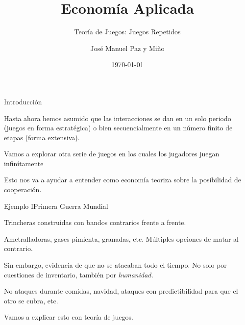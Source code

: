 \documentclass[notes, 11pt]{beamer} %
\newenvironment{wideitemize}{\itemize\addtolength{\itemsep}{10pt}}{\enditemize}
\begin{document}
\title{Econom\'ia Aplicada}   
\subtitle{Teor\'ia de Juegos: Juegos Repetidos}   
\author[Paz y Mino ]{Jos\'e Manuel Paz y Mi\~no}
\date{\today} 

\frame{\titlepage} 

\begin{frame}{Introducci\'on}
	\begin{wideitemize}
		\item<1-> Hasta ahora hemos asumido que las interacciones se dan en un solo periodo (juegos en forma estrat\'egica) o bien secuencialmente en un n\'umero finito de etapas (forma extensiva).
		\item<2-> Vamos a explorar otra serie de juegos en los cuales los jugadores juegan infin\'itamente
		\item<3-> Esto nos va a ayudar a entender como econom\'ia teoriza sobre la posibilidad de cooperaci\'on.
	\end{wideitemize}
\end{frame}

\begin{frame}{Ejemplo I}{Primera Guerra Mundial}
	\begin{wideitemize}
		\item<1-> Trincheras construidas con bandos contrarios frente a frente.
		\item<2-> Ametralladoras, gases pimienta, granadas, etc. M\'ultiples opciones de matar al contrario.
		\item<3-> Sin embargo, evidencia de que no se atacaban todo el tiempo. No solo por cuestiones de inventario, tambi\'en por \textit{humanidad.}
		\item<4-> No ataques durante comidas, navidad, ataques con predictibilidad para que el otro se cubra, etc.
		\item<5-> Vamos a explicar esto con teor\'ia de juegos.
	\end{wideitemize}
\end{frame}
\end{document}
